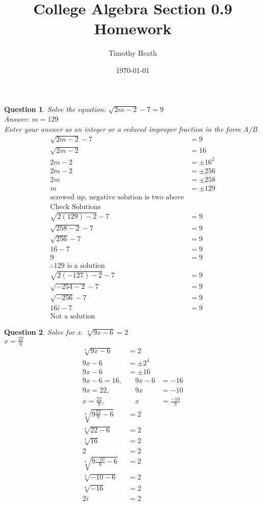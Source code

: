 \documentclass{article}
\title{College Algebra Section 0.9 Homework}
\author{Timothy Heath}
\date{\today}
\newtheorem{question}{Question}
\begin{document}
	\maketitle
	\listoftheorems
	\newpage
	\begin{question}
		Solve the equation: $\sqrt{2m-2}-7=9$\\
		Answer: $m=\boxed{129}$\\
		Enter your answer as an integer or a reduced
		improper fraction in the form A/B.\\
		$$
		\begin{aligned}
			\sqrt{2m-2}-7&=9\\
			\sqrt{2m-2}&=16\\
			2m-2&=\pm16^2\\
			2m-2&=\pm256\\
			2m&=\pm258\\
			m&=\pm129\\
			\text{screwed up, negative solution is two above}\\
			\text{Check Solutions}&\\
			\sqrt{2(129)-2}-7&=9\\
			\sqrt{258-2}-7&=9\\
			\sqrt{256}-7&=9\\
			16-7&=9\\
			9&=9\\
			\therefore\text{129 is a solution}&\\
			\sqrt{2(-127)-2}-7&=9\\
			\sqrt{-254-2}-7&=9\\
			\sqrt{-256}-7&=9\\
			16i-7&=9\\
			\text{Not a solution}
		\end{aligned}
		$$
	\end{question}
	\begin{question}
		Solve for x. $\sqrt[4]{9x-6}=2$\\
		$x=\boxed{\frac{22}{9}}$\\
		$$\begin{aligned}
			\sqrt[4]{9x-6}&=2\\
			9x-6&=\pm2^4\\
			9x-6&=\pm16\\
			9x-6=16,&\quad9x-6&=-16\\
			9x=22,&\quad9x&=-10\\
			x=\frac{22}{9},&\quad x&=\frac{-10}{9}\\
			\sqrt[4]{9\frac{22}{9}-6}&=2\\
			\sqrt[4]{22-6}&=2\\
			\sqrt[4]{16}&=2\\
			2&=2\\
			\sqrt[4]{9\frac{-10}{9}-6}&=2\\
			\sqrt[4]{-10-6}&=2\\
			\sqrt[4]{-16}&=2\\
			2i&=2\\
		\end{aligned}$$
	\end{question}
\end{document}
